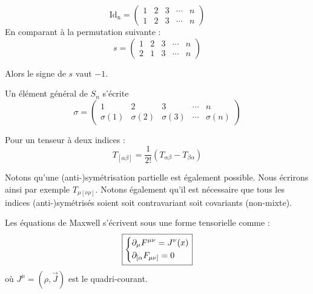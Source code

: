 \begin{equation*}
    \mathrm{Id_n} = 
    \begin{pmatrix}
        1 & 2 & 3 & \cdots & n \\
        1 & 2 & 3 & \cdots & n 
    \end{pmatrix}
\end{equation*}
En comparant à la permutation suivante :
\begin{equation*}
    s = 
    \begin{pmatrix}
        1 & 2 & 3 & \cdots & n \\
        2 & 1 & 3 & \cdots & n 
    \end{pmatrix}
\end{equation*}

Alors le signe de $s$ vaut $-1$.

Un élément général de $S_n$ s'écrite 
\begin{equation*}
\sigma = \begin{pmatrix}
1 & 2 & 3 & \cdots & n \\
\sigma(1) & \sigma(2) & \sigma(3) & \cdots & \sigma(n) 
\end{pmatrix}
\end{equation*}
\begin{exmp}
    Pour un tenseur à deux indices : 
    \begin{equation*}
        T_{[\alpha \beta]} = \frac{1}{2!}\left(T_{\alpha\beta} - T_{ \beta \alpha}\right)
    \end{equation*}
\end{exmp}
Notons qu'une (anti-)symétrisation partielle est également possible. Nous écrirons ainsi par exemple $T_{\mu [\nu \rho]}$. Notons également qu'il est nécessaire que tous les indices (anti-)symétrisés soient soit contravariant soit covariants (non-mixte).
\begin{theoremframe}
    \begin{propri}
        Les équations de Maxwell s'écrivent sous une forme tensorielle comme :
        \begin{align}
            \boxed{\begin{dcases}
                \partial_{\mu} F^{\mu \nu} = J^{\nu}(x) \\
                \partial_{[{\alpha}}F_{\mu \nu]} = 0
            \end{dcases}}
        \end{align}
        où $J^{\mu} = (\rho, \Vec{J})$ est le quadri-courant.
    \end{propri}
\end{theoremframe}
